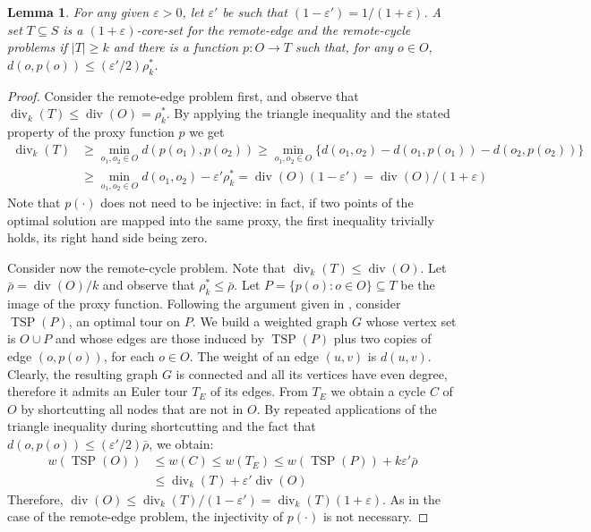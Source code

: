 \documentclass{article}
\newtheorem{lemma}{Lemma}
\DeclareMathOperator{\diversity}{div}
\renewcommand{\epsilon}{\varepsilon}
\begin{document}
\begin{lemma}\label{lem:remote-edge}
  For any given $\epsilon > 0$, let $\epsilon'$ be such that
  $(1-\epsilon')=1/(1+\epsilon)$. A set $T\subseteq S$ is a
  $(1+\epsilon)$-core-set for the remote-edge and the remote-cycle problems if
  $|T| \ge k$ and there is a function $p: O\rightarrow T$ such that, for any
  $o\in O$, $d(o, p(o)) \le (\epsilon'/2)\rho_k^*$.
\end{lemma}
\begin{proof}
  Consider the remote-edge problem first, and observe that 
  $\diversity_k(T)\leq\diversity(O)=\rho_k^*$. By
  applying the triangle inequality and the stated property of the proxy 
  function $p$ we get
  \[
    \begin{aligned}
      \diversity_k(T)
      &\ge \min_{o_1, o_2 \in O} d(p(o_1), p(o_2))
      \ge \min_{o_1, o_2 \in O} \{
      d(o_1, o_2) - d(o_1, p(o_1)) - d(o_2, p(o_2))
      \} \\
      &\ge \min_{o_1, o_2 \in O} d(o_1, o_2) -\epsilon'\rho_k^* 
      = \diversity(O)(1-\epsilon') = \diversity(O)/(1+\epsilon)
    \end{aligned}
  \]
  Note that $p(\cdot)$ does not need to be injective: in fact, if two
  points of the optimal solution are mapped into the same proxy, the
  first inequality trivially holds, its right hand side being zero.

  Consider now the remote-cycle problem.
  Note that $\diversity_k(T) \leq \diversity(O)$. Let $\bar{\rho} =
  \diversity(O)/k$ and observe that $\rho_k^* \le \bar{\rho}$.
Let $P=\{p(o) : o\in O\} \subseteq T$ be the image of the proxy
  function. Following the argument given in
  \cite{IndykMMM14,AghamolaeiFZ15}, consider $\operatorname{TSP}(P)$,
  an optimal tour on $P$. We build a weighted graph $G$ whose vertex
  set is $O\cup P$ and whose edges are those induced by
  $\operatorname{TSP}(P)$ plus two copies of edge $(o, p(o))$, for
  each $o\in O$. The weight of an edge $(u,v)$ is $d(u,v)$.  Clearly,
  the resulting graph $G$ is connected and all its vertices have even
  degree, therefore it admits an Euler tour $T_E$ of its edges. From
  $T_E$ we obtain a cycle $C$ of $O$ by shortcutting all nodes that
  are not in $O$. By repeated applications of the triangle inequality
  during shortcutting and the fact that
  $d(o, p(o)) \le (\epsilon'/2) \bar\rho$, we obtain:
  \[
    \begin{aligned}
      w(\operatorname{TSP}(O))
      &\le w(C) \le w(T_E)
      \le w(\operatorname{TSP}(P)) + k\epsilon' \bar{\rho}\\
      &\le \diversity_k(T) + \epsilon' \diversity(O)
    \end{aligned}
  \]
  Therefore,
  $\diversity(O) \le \diversity_k(T)/(1-\epsilon') =
  \diversity_k(T)(1+\epsilon)$.
  As in the case of the remote-edge problem, the injectivity of $p(\cdot)$ is not necessary.
\end{proof}
\end{document}

